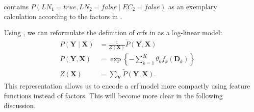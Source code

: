  contains $P(LN_1{=}\mathit{true},LN_2{=}\mathit{false}\mid EC_2{=}\mathit{false})$ as an exemplary calculation according to the \glspl{factor} in .

\bigskip

Using , we can reformulate the definition of \glspl{crf} in  as a \gls{log-linear model}:
\begin{equation}
  \label{equ:crf-log-linear}
  \begin{split}
    P(\mathbf{Y}\mid\mathbf{X}) & = \frac{1}{Z(\mathbf{X})}\tilde{P}(\mathbf{Y},\mathbf{X}) \\
    \tilde{P}(\mathbf{Y},\mathbf{X}) & = \exp\left\{ -\sum_{k=1}^K \theta_k f_k\left(\mathbf{D}_k\right)\right\} \\
    Z(\mathbf{X}) & = \sum_{\mathbf{Y}}\tilde{P}(\mathbf{Y},\mathbf{X}).
  \end{split}
\end{equation}
This representation allows us to encode a \gls{crf} model more compactly using \glspl{feature function} instead of \glspl{factor}.
This will become more clear in the following discussion.

\bigskip

